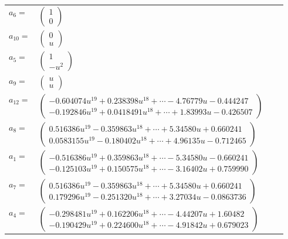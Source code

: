 \documentclass[1p]{elsarticle_modified}
\theoremstyle{definition}
\begin{document}
\begin{tabular}{m{7pt} m{180pt} m{7pt} m{180pt} }
\flushright $a_{6}=$&$\begin{pmatrix}1\\0\end{pmatrix}$ \\
\flushright $a_{10}=$&$\begin{pmatrix}0\\u\end{pmatrix}$ \\
\flushright $a_{5}=$&$\begin{pmatrix}1\\- u^2\end{pmatrix}$ \\
\flushright $a_{9}=$&$\begin{pmatrix}u\\u\end{pmatrix}$ \\
\flushright $a_{12}=$&$\begin{pmatrix}-0.604074 u^{19}+0.238398 u^{18}+\cdots-4.76779 u-0.444247\\-0.192846 u^{19}+0.0418491 u^{18}+\cdots+1.83993 u-0.426507\end{pmatrix}$ \\
\flushright $a_{8}=$&$\begin{pmatrix}0.516386 u^{19}-0.359863 u^{18}+\cdots+5.34580 u+0.660241\\0.0583155 u^{19}-0.180402 u^{18}+\cdots+4.96135 u-0.712465\end{pmatrix}$ \\
\flushright $a_{1}=$&$\begin{pmatrix}-0.516386 u^{19}+0.359863 u^{18}+\cdots-5.34580 u-0.660241\\-0.125103 u^{19}+0.150575 u^{18}+\cdots-3.16402 u+0.759990\end{pmatrix}$ \\
\flushright $a_{7}=$&$\begin{pmatrix}0.516386 u^{19}-0.359863 u^{18}+\cdots+5.34580 u+0.660241\\0.179296 u^{19}-0.251320 u^{18}+\cdots+3.27034 u-0.0863736\end{pmatrix}$ \\
\flushright $a_{4}=$&$\begin{pmatrix}-0.298481 u^{19}+0.162206 u^{18}+\cdots-4.44207 u+1.60482\\-0.190429 u^{19}+0.224600 u^{18}+\cdots-4.91842 u+0.679023\end{pmatrix}$ \\

\end{tabular}
\end{document}
